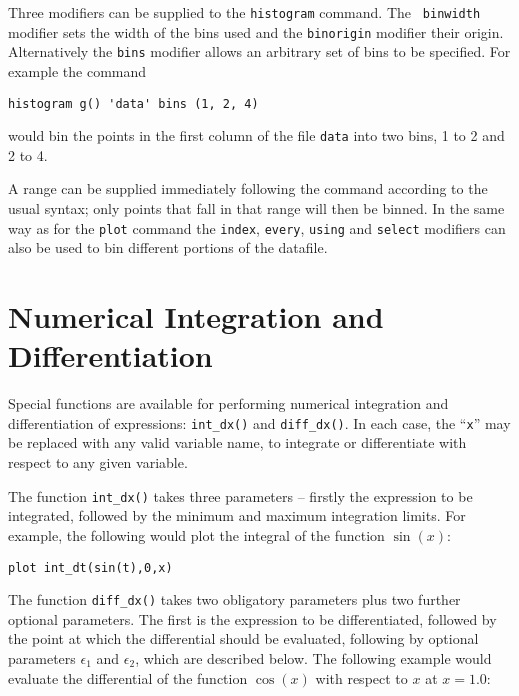 \documentclass[a4paper,onecolumn,11pt]{book}
\begin{document}
Three modifiers can be supplied to the {\tt histogram} command.  The {\tt
binwidth} modifier sets the width of the bins used and the {\tt binorigin}
modifier their origin.   Alternatively the {\tt bins} modifier allows an
arbitrary set of bins to be specified.  For example the command

\begin{verbatim}
histogram g() 'data' bins (1, 2, 4)
\end{verbatim}

\noindent would bin the points in the first column of the file {\tt data} into
two bins, 1 to 2 and 2 to 4.

A range can be supplied immediately following the command according to the usual
syntax; only points that fall in that range will then be binned.  In the same
way as for the {\tt plot} command the {\tt index}, {\tt every}, {\tt using} and
{\tt select} modifiers can also be used to bin different portions of the
datafile.

\section{Numerical Integration and Differentiation}

Special functions are available for performing numerical integration and
differentiation of expressions: \texttt{int\_dx()} and
\texttt{diff\_dx()}. In each case, the ``\texttt{x}'' may be
replaced with any valid variable name, to integrate or differentiate with
respect to any given variable.

The function \texttt{int\_dx()} takes three parameters -- firstly the
expression to be integrated, followed by the minimum and maximum integration
limits. For example, the following would plot the integral of the function
$\sin(x)$:

\begin{verbatim}
plot int_dt(sin(t),0,x)
\end{verbatim} 

The function \texttt{diff\_dx()} takes two obligatory parameters plus two
further optional parameters. The first is the expression to be differentiated,
followed by the point at which the differential should be evaluated, following
by optional parameters $\epsilon_1$ and $\epsilon_2$, which are described
below.  The following example would evaluate the differential of the function
$\cos(x)$ with respect to $x$ at $x=1.0$:
\end{document}
